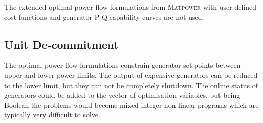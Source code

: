 The extended optimal power flow formulations from \textsc{Matpower} with
user-defined cost functions and generator P-Q capability curves are not used.


\subsection{Unit De-commitment}
\label{sec:decommit}
The optimal power flow formulations constrain generator set-points between
upper and lower power limits.  The output of expensive generators can be
reduced to the lower limit, but they can not be completely shutdown.  The
online status of generators could be added to the vector of
optimisation variables, but being Boolean the problems would become
mixed-integer non-linear programs which are typically very difficult to
solve.

